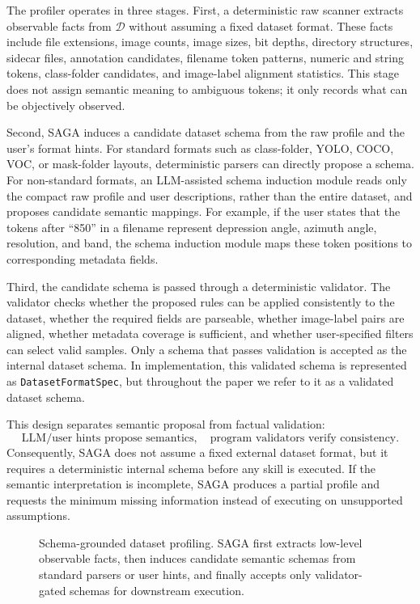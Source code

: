The profiler operates in three stages.
First, a deterministic raw scanner extracts observable facts from $\mathcal{D}$ without assuming a fixed dataset format.
These facts include file extensions, image counts, image sizes, bit depths, directory structures, sidecar files, annotation candidates, filename token patterns, numeric and string tokens, class-folder candidates, and image-label alignment statistics.
This stage does not assign semantic meaning to ambiguous tokens; it only records what can be objectively observed.

Second, SAGA induces a candidate dataset schema from the raw profile and the user's format hints.
For standard formats such as class-folder, YOLO, COCO, VOC, or mask-folder layouts, deterministic parsers can directly propose a schema.
For non-standard formats, an LLM-assisted schema induction module reads only the compact raw profile and user descriptions, rather than the entire dataset, and proposes candidate semantic mappings.
For example, if the user states that the tokens after ``850'' in a filename represent depression angle, azimuth angle, resolution, and band, the schema induction module maps these token positions to corresponding metadata fields.

Third, the candidate schema is passed through a deterministic validator.
The validator checks whether the proposed rules can be applied consistently to the dataset, whether the required fields are parseable, whether image-label pairs are aligned, whether metadata coverage is sufficient, and whether user-specified filters can select valid samples.
Only a schema that passes validation is accepted as the internal dataset schema.
In implementation, this validated schema is represented as \texttt{DatasetFormatSpec}, but throughout the paper we refer to it as a validated dataset schema.

This design separates semantic proposal from factual validation:
\begin{equation}
\text{LLM/user hints propose semantics}, \quad
\text{program validators verify consistency}.
\end{equation}
Consequently, SAGA does not assume a fixed external dataset format, but it requires a deterministic internal schema before any skill is executed.
If the semantic interpretation is incomplete, SAGA produces a partial profile and requests the minimum missing information instead of executing on unsupported assumptions.

\begin{figure}[t]
    \centering
    \caption{Schema-grounded dataset profiling. SAGA first extracts low-level observable facts, then induces candidate semantic schemas from standard parsers or user hints, and finally accepts only validator-gated schemas for downstream execution.}
    \label{fig:schema_profiling}
\end{figure}

